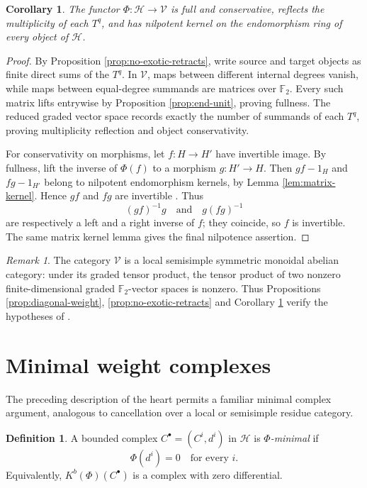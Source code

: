 \documentclass[11pt]{amsart}
\numberwithin{equation}{section}
\newtheorem{corollary}[theorem]{Corollary}
\theoremstyle{definition}
\newtheorem{definition}[theorem]{Definition}
\theoremstyle{remark}
\newtheorem{remark}[theorem]{Remark}
\newcommand{\F}{\mathbb F_2}
\newcommand{\Hh}{\mathcal H}
\newcommand{\V}{\mathcal V}
\begin{document}
\begin{corollary}\label{cor:heart-functor}
The functor $\Phi\colon\Hh\to\V$ is full and conservative, reflects the
multiplicity of each $T^q$, and has nilpotent kernel on the endomorphism ring
of every object of $\Hh$.
\end{corollary}

\begin{proof}
By Proposition \ref{prop:no-exotic-retracts}, write source and target objects as finite
direct sums of the $T^q$.  In $\V$, maps between different internal degrees
vanish, while maps between equal-degree summands are matrices over $\F$.
Every such matrix lifts entrywise by Proposition \ref{prop:end-unit}, proving fullness.
The reduced graded vector space records exactly the number of summands of
each $T^q$, proving multiplicity reflection and object conservativity.

For conservativity on morphisms, let $f\colon H\to H'$ have invertible image.
By fullness, lift the inverse of $\Phi(f)$ to a morphism
$g\colon H'\to H$.  Then $gf-1_H$ and $fg-1_{H'}$ belong to nilpotent
endomorphism kernels, by Lemma \ref{lem:matrix-kernel}.  Hence $gf$ and $fg$ are
invertible .  Thus
\[
  (gf)^{-1}g
  \quad\text{and}\quad
  g(fg)^{-1}
\]
are respectively a left and a right inverse of $f$; they coincide, so $f$ is
invertible.  The same matrix kernel lemma gives the final nilpotence
assertion.
\end{proof}

\begin{remark}
The category $\V$ is a local semisimple symmetric monoidal abelian category:
under its graded tensor product, the tensor product of two nonzero
finite-dimensional graded $\F$-vector spaces is nonzero.  Thus Propositions 
\ref{prop:diagonal-weight}, \ref{prop:no-exotic-retracts} and Corollary \ref{cor:heart-functor} verify
the hypotheses of \cite[Theorem~1.1]{BondarkoTabuadaPicard}.
\end{remark}

\section{Minimal weight complexes}\label{sec:minimal-complexes}

The preceding description of the heart permits a familiar minimal complex
argument, analogous to cancellation over a local or semisimple residue
category.

\begin{definition}\label{def:Phi-minimal}
A bounded complex $C^\bullet=(C^i,d^i)$ in $\Hh$ is
\emph{$\Phi$-minimal} if
\[
  \Phi(d^i)=0
  \quad\text{for every }i.
\]
Equivalently, $K^b(\Phi)(C^\bullet)$ is a complex with zero differential.
\end{definition}
\end{document}
